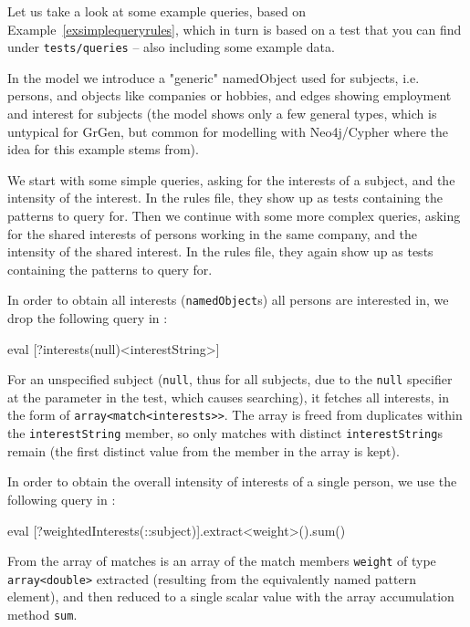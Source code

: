 \begin{example}\label{exsimplequery}

Let us take a look at some example queries, based on Example~\ref{exsimplequeryrules}, which in turn is based on a test that you can find under \texttt{tests/queries} -- also including some example data.

In the model we introduce a "generic" namedObject used for subjects, i.e. persons, and objects like companies or hobbies, and edges showing employment and interest for subjects (the model shows only a few general types, which is untypical for GrGen, but common for modelling with Neo4j/Cypher where the idea for this example stems from).

We start with some simple queries, asking for the interests of a subject, and the intensity of the interest.
In the rules file, they show up as tests containing the patterns to query for.
Then we continue with some more complex queries, asking for the shared interests of persons working in the same company, and the intensity of the shared interest.
In the rules file, they again show up as tests containing the patterns to query for.

\vspace{3mm}

In order to obtain all interests (\texttt{namedObject}s) all persons are interested in, we drop the following query in \GrShell:

	\begin{grshell}
eval [?interests(null)\keepOneForEach<interestString>]
  \end{grshell}

For an unspecified subject (\texttt{null}, thus for all subjects, due to the \texttt{null} specifier at the parameter in the test, which causes searching), it fetches all interests, in the form of \texttt{array<match<interests>>}. The array is freed from duplicates within the \texttt{interestString} member, so only matches with distinct \texttt{interestString}s remain (the first distinct value from the member in the array is kept).

In order to obtain the overall intensity of interests of a single person, we use the following query in \GrShell:

	\begin{grshell}
eval [?weightedInterests(::subject)].extract<weight>().sum()
  \end{grshell}

From the array of matches is an array of the match members \texttt{weight} of type \texttt{array<double>} extracted (resulting from the equivalently named pattern element), and then reduced to a single scalar value with the array accumulation method \texttt{sum}.


\end{example}
